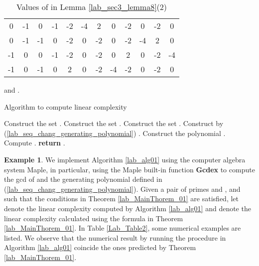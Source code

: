\documentclass{mcom-l}
\theoremstyle{definition}
\newtheorem{sec3exp1}{Example}[section]
\numberwithin{equation}{section}
\begin{document}
      \begin{table}[!t]
       \begin{threeparttable}[t]
       \renewcommand{\arraystretch}{1.3}
       \caption{Values of  in Lemma \ref{lab_sec3_lemma8}(2)
       \label{Lab_Table1}}
       \centering
       \begin{tabular}{c|c|c|c|c|c|c|c|c|c|c|c}
       \hline
       &  &  &  &  &  &  &  &  &  &  & \\
       \hline
       0 & -1 & 0 & -1 & -2 & -4 & 2 & 0 & -2 & 0 & -2 & 0\\
       \hline
       0 & -1 & -1 & 0 & -2 &  0 & -2 & 0 & -2 & -4 & 2 & 0\\
       \hline
       -1 & 0 & 0 & -1 & -2 &  0 & -2 & 0 & 2 & 0 & -2 & -4\\
       \hline
       -1 & 0 & -1 & 0 & 2 &  0 & -2 & -4 & -2 & 0 & -2 & 0\\
       \hline
       \end{tabular}
        \begin{tablenotes}
                   \item [1]  and .
        \end{tablenotes}
       \end{threeparttable}
       \end{table}
    \begin{algorithm}
      \caption{Algorithm to compute linear complexity}\label{lab_alg01}
      \begin{algorithmic}[1]
      \State Construct the set .
      \State Construct the set .
      \State Construct the set .
      \State Construct  by (\ref{lab_seq_chang_generating_polynomial}) .
      \State Construct the polynomial .
      \State Compute .
      \State \textbf{return} .
      \EndProcedure
      \end{algorithmic}
      \end{algorithm}
    \begin{sec3exp1}\label{lab_sec3exp1}
      We implement Algorithm \ref{lab_alg01} using the computer algebra system Maple, in particular, using the Maple built-in function \textbf{Gcdex} to compute the gcd of  and the generating polynomial  defined in (\ref{lab_seq_chang_generating_polynomial}). Given a pair of primes  and , and  such that the conditions in Theorem \ref{lab_MainThorem_01} are satisfied, let  denote the linear complexity computed by Algorithm \ref{lab_alg01} and  denote the linear complexity calculated using the formula in Theorem \ref{lab_MainThorem_01}. In Table \ref{Lab_Table2}, some numerical examples are listed. We observe that the numerical result by running the procedure in Algorithm \ref{lab_alg01} coincide the ones predicted by Theorem \ref{lab_MainThorem_01}.
      \end{sec3exp1}
\end{document}
